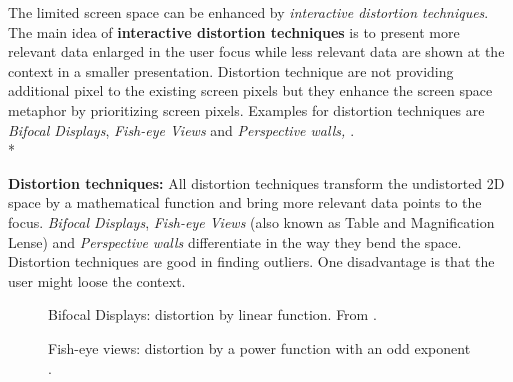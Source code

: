 The limited screen space can be enhanced by \textit{interactive distortion techniques}\cite{mackinlay1991perspective}.
The main idea of \textbf{interactive distortion techniques} is to present more relevant data enlarged in the user focus while less relevant data are shown at the context in a smaller presentation. Distortion technique are not  providing additional pixel to the existing screen pixels but they enhance the screen space metaphor by prioritizing screen pixels.
Examples for distortion techniques are \textit{Bifocal Displays}\cite{Spence1982}, \textit{Fish-eye Views} and \textit{Perspective walls\cite{Keim2005}, \cite{mackinlay1991perspective}}.\\*

\textbf{Distortion techniques:} All distortion techniques transform the undistorted 2D space by a mathematical function and bring more relevant data points to the focus. \textit{Bifocal Displays}, \textit{Fish-eye Views} (also known as Table and Magnification Lense) and \textit{Perspective walls} differentiate in the way they bend the space. Distortion techniques are good in finding outliers. One disadvantage is that the user might loose the context.
\begin{figure}[H]
    \centering
    \caption{Bifocal Displays: distortion by linear function. From \cite{Stroe1999}.}
    \label{fig:bifocal}
\end{figure}

\begin{figure}[H]
    \centering
    \caption{Fish-eye views:  distortion by a power function with an odd exponent \cite{Stroe1999}.}
    \label{fig:fisheye}
\end{figure}

